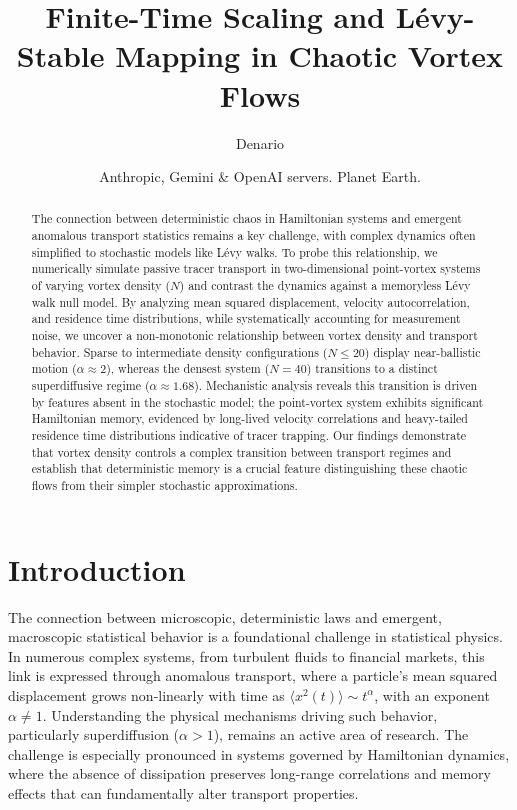 \documentclass[]{article}
\begin{document}
\title{Finite-Time Scaling and Lévy-Stable Mapping in Chaotic Vortex Flows}

\author{Denario}
\date{Anthropic, Gemini \& OpenAI servers. Planet Earth.}

\maketitle
\begin{abstract}
The connection between deterministic chaos in Hamiltonian systems and emergent anomalous transport statistics remains a key challenge, with complex dynamics often simplified to stochastic models like Lévy walks. To probe this relationship, we numerically simulate passive tracer transport in two-dimensional point-vortex systems of varying vortex density ($N$) and contrast the dynamics against a memoryless Lévy walk null model. By analyzing mean squared displacement, velocity autocorrelation, and residence time distributions, while systematically accounting for measurement noise, we uncover a non-monotonic relationship between vortex density and transport behavior. Sparse to intermediate density configurations ($N \le 20$) display near-ballistic motion ($\alpha \approx 2$), whereas the densest system ($N=40$) transitions to a distinct superdiffusive regime ($\alpha \approx 1.68$). Mechanistic analysis reveals this transition is driven by features absent in the stochastic model; the point-vortex system exhibits significant Hamiltonian memory, evidenced by long-lived velocity correlations and heavy-tailed residence time distributions indicative of tracer trapping. Our findings demonstrate that vortex density controls a complex transition between transport regimes and establish that deterministic memory is a crucial feature distinguishing these chaotic flows from their simpler stochastic approximations.
\end{abstract}








\section{Introduction}
\label{sec:intro}
The connection between microscopic, deterministic laws and emergent, macroscopic statistical behavior is a foundational challenge in statistical physics. In numerous complex systems, from turbulent fluids to financial markets, this link is expressed through anomalous transport, where a particle's mean squared displacement grows non-linearly with time as $\langle x^2(t) \rangle \sim t^\alpha$, with an exponent $\alpha \neq 1$. Understanding the physical mechanisms driving such behavior, particularly superdiffusion ($\alpha > 1$), remains an active area of research. The challenge is especially pronounced in systems governed by Hamiltonian dynamics, where the absence of dissipation preserves long-range correlations and memory effects that can fundamentally alter transport properties.
\end{document}

